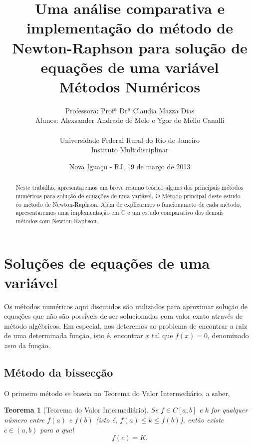 \documentclass[a4paper, 10pt]{article} %
\title{\sc Uma análise comparativa e implementação do método de Newton-Raphson para solução de equações de uma variável \vspace{1cm} \\
\bf Métodos Numéricos}
\author{Professora: Profª Drª Claudia Mazza Dias\\
Alunos: Alexsander Andrade de Melo e Ygor de Mello Canalli\\ \\
Universidade Federal Rural do Rio de Janeiro\\
Instituto Multidisciplinar\\ }
\date{Nova Iguaçu - RJ, 19 de março de 2013}
\newtheorem{teo}{Teorema}[section]
\theoremstyle{definition}
\theoremstyle{definition}
\numberwithin{equation}{section} %
\numberwithin{lstlisting}{section}
\numberwithin{algorithm}{section}
\numberwithin{table}{section}
\begin{document}
\maketitle %

\begin{abstract}
 Neste trabalho, apresentaremos um breve resumo teórico alguns dos principais métodos numéricos para solução de equações de uma variável. O Método principal deste estudo éo método de Newton-Raphson. Além de explicarmos o funcionameto de cada método, apresentaremos uma implementação em C e um estudo comparativo dos demais métodos com Newton-Raphson.
\end{abstract}

\tableofcontents



\section{Soluções de equações de uma variável}

Os métodos numéricos aqui discutidos são utilizados para aproximar solução de equações que não são possíveis de ser solucionadas com valor exato através de método algébricos. Em especial, nos deteremos ao problema de encontrar a raiz de uma determinada função, isto é, encontrar $x$ tal que $f(x) = 0$, denominado \emph{zero} da função.

\subsection{Método da bissecção}

O primeiro método se baseia no Teorema do Valor Intermediário, a saber,

\begin{teo}[Teorema do Valor Intermediário]
Se $f \in C[a, b]$ e $k$ for qualquer número entre $f(a)$ e $f(b)$ (isto é, $f(a) \leq k \leq f(b)$), então existe $c \in (a, b)$ para o qual \[f(c) = K\text{.}\]
\end{teo}
\end{document}
